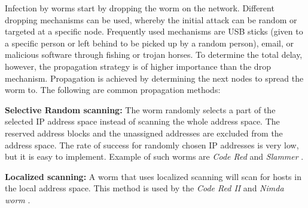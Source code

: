 Infection by worms start by dropping the worm on the network. Different dropping mechanisms can be used, whereby the initial attack can be random or targeted at a specific node. Frequently used mechanisms are USB sticks (given to a specific person or left behind to be picked up by a random person), email, or malicious software through fishing or trojan horses. To determine the total delay, however, the propagation strategy is of higher importance than the drop mechanism. Propagation is achieved by determining the next nodes to spread the worm to. The following are common propagation methods: 
\begin{description}

\item \textbf{Selective Random scanning:} The worm randomly  selects a part of the selected IP address space instead of scanning the whole address space. The reserved address blocks and the unassigned addresses are excluded from the address space. The rate of success for randomly chosen IP addresses is very low, but it is easy to implement. Example of such worms are \textit{Code Red} \citep{OwnInternetSI} and \textit{Slammer} \citep{moore2003inside}. 

\item \textbf{Localized scanning:} A worm that uses localized scanning will scan for hosts in the local address space. This method is used by the \textit{Code Red II} \citep{OwnInternetSI} and \textit{Nimda worm} \citep{OwnInternetSI}.



\end{description}
